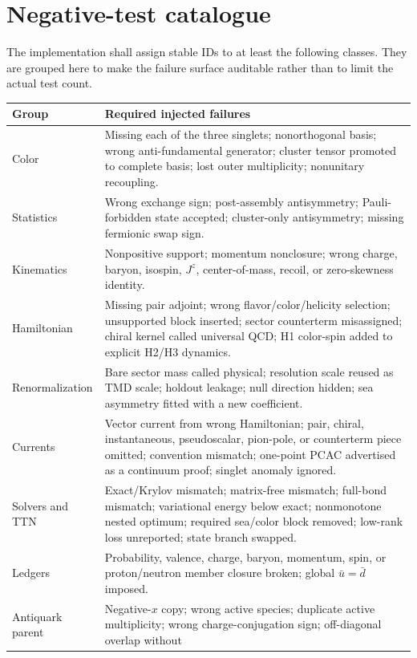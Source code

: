 \documentclass[11pt]{article}
\newcommand{\Jz}{J^z}
\begin{document}
\section{Negative-test catalogue}

The implementation shall assign stable IDs to at least the following classes.
They are grouped here to make the failure surface auditable rather than to
limit the actual test count.

\begin{longtable}{L{0.18\textwidth}L{0.72\textwidth}}
\toprule
Group & Required injected failures\\
\midrule
\endhead
Color & Missing each of the three singlets; nonorthogonal basis; wrong
anti-fundamental generator; cluster tensor promoted to complete basis; lost
outer multiplicity; nonunitary recoupling.\\
Statistics & Wrong exchange sign; post-assembly antisymmetry; Pauli-forbidden
state accepted; cluster-only antisymmetry; missing fermionic swap sign.\\
Kinematics & Nonpositive support; momentum nonclosure; wrong charge, baryon,
isospin, \(\Jz\), center-of-mass, recoil, or zero-skewness identity.\\
Hamiltonian & Missing pair adjoint; wrong flavor/color/helicity selection;
unsupported block inserted; sector counterterm misassigned; chiral kernel
called universal QCD; H1 color-spin added to explicit H2/H3 dynamics.\\
Renormalization & Bare sector mass called physical; resolution scale reused as
TMD scale; holdout leakage; null direction hidden; sea asymmetry fitted with a
new coefficient.\\
Currents & Vector current from wrong Hamiltonian; pair, chiral, instantaneous,
pseudoscalar, pion-pole, or counterterm piece omitted; convention mismatch;
one-point PCAC advertised as a continuum proof; singlet anomaly ignored.\\
Solvers and TTN & Exact/Krylov mismatch; matrix-free mismatch; full-bond
mismatch; variational energy below exact; nonmonotone nested optimum; required
sea/color block removed; low-rank loss unreported; state branch swapped.\\
Ledgers & Probability, valence, charge, baryon, momentum, spin, or
proton/neutron member closure broken; global \(\bar u=\bar d\) imposed.\\
Antiquark parent & Negative-\(x\) copy; wrong active species; duplicate active
multiplicity; wrong charge-conjugation sign; off-diagonal overlap without

\end{longtable}
\end{document}
